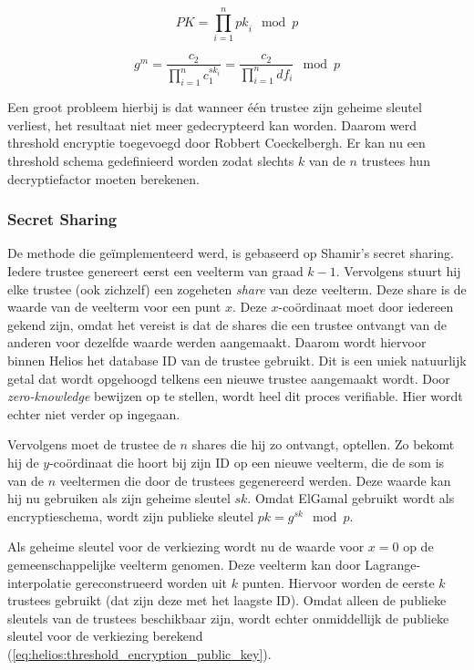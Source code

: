 \begin{equation}
  \label{eq:helios:elgamal_c2_homomorphic_trustees}
  PK = \prod_{i=1}^n{{pk}_i} \mod{p}
\end{equation}

\begin{equation}
  \label{eq:helios:elgamal_m_homomorphic_trustees}
  g^m = \frac{c_2}{\prod_{i=1}^n{c_1^{{sk}_i}}} = \frac{c_2}{\prod_{i=1}^n{{df}_i}} \mod{p}
\end{equation}

\npar Een groot probleem hierbij is dat wanneer \'e\'en trustee zijn geheime sleutel verliest, het resultaat niet meer gedecrypteerd kan worden. Daarom werd threshold encryptie toegevoegd door Robbert Coeckelbergh.\cite{coeckelbergh_toepassing_en_uitbreiding_van_het_helios_online_verkiezingssysteem} Er kan nu een threshold schema gedefinieerd worden zodat slechts $k$ van de $n$ trustees hun decryptiefactor moeten berekenen.

\subsubsection{Secret Sharing}

De methode die ge\"implementeerd werd, is gebaseerd op Shamir's secret sharing.\cite{shamir_how_to_share_a_secret} Iedere trustee genereert eerst een veelterm van graad $k - 1$. Vervolgens stuurt hij elke trustee (ook zichzelf) een zogeheten \textit{share} van deze veelterm. Deze share is de waarde van de veelterm voor een punt $x$. Deze $x$-co\"ordinaat moet door iedereen gekend zijn, omdat het vereist is dat de shares die een trustee ontvangt van de anderen voor dezelfde waarde werden aangemaakt. Daarom wordt hiervoor binnen Helios het database ID van de trustee gebruikt. Dit is een uniek natuurlijk getal dat wordt opgehoogd telkens een nieuwe trustee aangemaakt wordt. Door \textit{zero-knowledge} bewijzen op te stellen, wordt heel dit proces verifiable. Hier wordt echter niet verder op ingegaan.

\npar Vervolgens moet de trustee de $n$ shares die hij zo ontvangt, optellen. Zo bekomt hij de $y$-co\"ordinaat die hoort bij zijn ID op een nieuwe veelterm, die de som is van de $n$ veeltermen die door de trustees gegenereerd werden. Deze waarde kan hij nu gebruiken als zijn geheime sleutel ${sk}$. Omdat ElGamal gebruikt wordt als encryptieschema, wordt zijn publieke sleutel ${pk} = g^{sk} \mod{p}$.

\npar Als geheime sleutel voor de verkiezing wordt nu de waarde voor $x = 0$ op de gemeenschappelijke veelterm genomen. Deze veelterm kan door Lagrange-interpolatie gereconstrueerd worden uit $k$ punten. Hiervoor worden de eerste $k$ trustees gebruikt (dat zijn deze met het laagste ID). Omdat alleen de publieke sleutels van de trustees beschikbaar zijn, wordt echter onmiddellijk de publieke sleutel voor de verkiezing berekend (\ref{eq:helios:threshold_encryption_public_key}).

